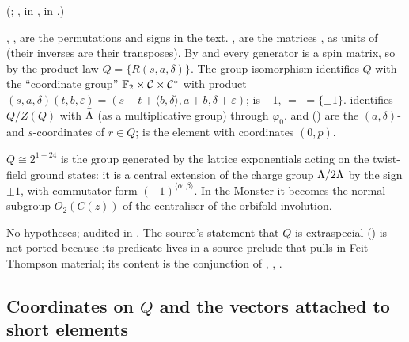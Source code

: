 (;
,  in ,  in .)
\begin{dictionary}
, ,  are the permutations and signs in the text.
,  are the matrices ,  as units of
 (their inverses are their transposes).  By  and
 every generator is a spin matrix, so by the product law
$Q=\{R(s,a,\delta)\}$.  The
group isomorphism  identifies $Q$ with the ``coordinate group''
$\mathbb{F}_2\times\mathcal{C}\times\mathcal{C}^*$ with product
$(s,a,\delta)(t,b,\varepsilon)=(s+t+\langle b,\delta\rangle,a+b,\delta+\varepsilon)$;  is
$-1$,  $=$  $=\{\pm1\}$.   identifies $Q/Z(Q)$ with
$\bar{\Lambda}$ (as a multiplicative group) through $\varphi_0$.   and
 () are the $(a,\delta)$- and $s$-coordinates of
$r\in Q$;  is the element with coordinates $(0,p)$.
\end{dictionary}
\begin{physics}
$Q\cong2^{1+24}$ is the group generated by the lattice exponentials acting on the twist-field ground
states: it is a central extension of the charge group ${\Lambda}/2{\Lambda}$ by the sign $\pm1$, with
commutator form $(-1)^{\langle\alpha,\beta\rangle}$.  In the Monster it becomes the normal subgroup
$O_2(C(z))$ of the centraliser of the orbifold involution.
\end{physics}
\begin{status}
No hypotheses; audited in .  The source's statement that $Q$ is extraspecial
() is not ported because its predicate lives in a source prelude that pulls
in Feit--Thompson material; its content is the conjunction of , ,
.
\end{status}

\subsection{Coordinates on \texorpdfstring{$Q$}{Q} and the vectors attached to short elements}

